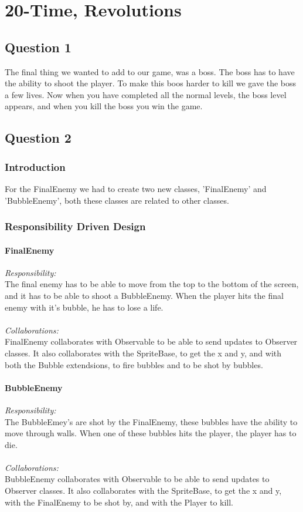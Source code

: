 \chapter{20-Time, Revolutions}

\section{Question 1}

The final thing we wanted to add to our game, was a boss. The boss has to have the ability to shoot the player. To make this boos harder to kill we gave the boss a few lives. Now when you have completed all the normal levels, the boss level appears, and when you kill the boss you win the game.

\section{Question 2}

\subsection{Introduction}

For the FinalEnemy we had to create two new classes, 'FinalEnemy' and 'BubbleEnemy', both these classes are related to other classes.

\subsection{Responsibility Driven Design} 

\subsubsection{FinalEnemy}
\textit{Responsibility:} \\
The final enemy has to be able to move from the top to the bottom of the screen, and it has to be able to shoot a BubbleEnemy. When the player hits the final enemy with it's bubble, he has to lose a life. \\ \\
\textit{Collaborations:} \\
FinalEnemy collaborates with Observable to be able to send updates to Observer classes. It also collaborates with  the SpriteBase, to get the x and y, and with both the Bubble extendsions, to fire bubbles and to be shot by bubbles.

\subsubsection{BubbleEnemy}
\textit{Responsibility:} \\
The BubbleEmey's are shot by the FinalEnemy, these bubbles have the ability to move through walls. When one of these bubbles hits the player, the player has to die. \\ \\
\textit{Collaborations:} \\
BubbleEnemy collaborates with Observable to be able to send updates to Observer classes. It also collaborates with  the SpriteBase, to get the x and y, with the FinalEnemy to be shot by, and with the Player to kill.

